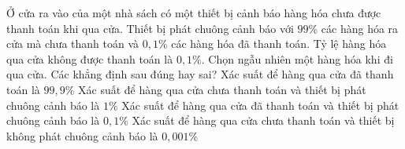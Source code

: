 \begin{ex}%
	Ở cửa ra vào của một nhà sách có một thiết bị cảnh báo hàng hóa chưa được thanh toán khi qua cửa. Thiết bị phát chuông  cảnh báo với $99\%$ các hàng hóa ra cửa mà chưa thanh toán và $0{,}1\%$ các hàng hóa đã thanh toán. Tỷ lệ hàng hóa qua cửa không được thanh toán là $0{,}1\%$. Chọn ngẫu nhiên một hàng hóa khi đi qua cửa. Các khẳng định sau đúng hay sai?
	\choiceTF 
		{\True Xác suất để hàng qua cửa  đã thanh toán là $99{,}9\%$}
		{Xác suất để hàng qua cửa chưa thanh toán và thiết bị phát chuông cảnh báo  là $1\%$}
		{Xác suất để hàng qua cửa  đã thanh toán và thiết bị phát chuông cảnh báo là $0{,}1\%$}
		{\True Xác suất để hàng qua cửa  chưa thanh toán và thiết bị không phát chuông cảnh báo là $0{,}001\%$}
\end{ex}

